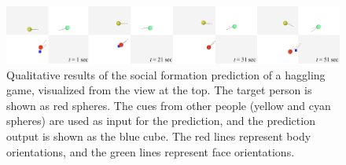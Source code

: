\begin{figure}[t]
	\centering       
	\includegraphics[trim=20 2 2 10,clip, width=\linewidth]{ssp_fig/qual_predForm}
	\caption{Qualitative results of the social formation prediction of a haggling game, visualized from the view at the top. The target person is shown as red spheres. The cues from other people (yellow and cyan spheres) are used as input for the prediction, and the prediction output is shown as the blue cube. The red lines represent body orientations, and the green lines represent face orientations.} 
	\label{fig:qual_form_pred}
\end{figure}







